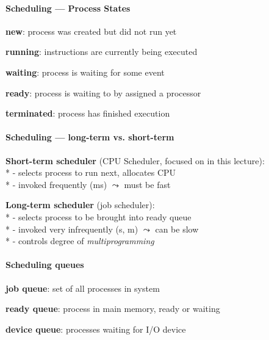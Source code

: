 \paragraph{Scheduling --- Process States}
\begin{items}
  \item \textbf{new}: process was created but did not run yet
  \item \textbf{running}: instructions are currently being executed
  \item \textbf{waiting}: process is waiting for some event
  \item \textbf{ready}: process is waiting to by assigned a processor
  \item \textbf{terminated}: process has finished execution
\end{items}

\paragraph{Scheduling --- long-term vs. short-term}
\begin{items}
  \item \textbf{Short-term scheduler} (CPU Scheduler, focused on in this lecture): \\*
    - selects process to run next, allocates CPU \\*
    - invoked frequently (ms) \( \leadsto \) must be fast
  \item \textbf{Long-term scheduler} (job scheduler): \\*
    - selects process to be brought into ready queue \\*
    - invoked very infrequently (s, m) \( \leadsto \) can be slow \\*
    - controls degree of \emph{multiprogramming}
\end{items}

\paragraph{Scheduling queues}
\begin{items}
  \item \textbf{job queue}: set of all processes in system
  \item \textbf{ready queue}: process in main memory, ready or waiting
  \item \textbf{device queue}: processes waiting for I/O device
\end{items}

